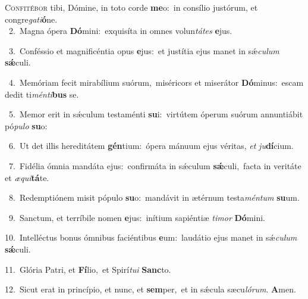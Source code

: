 \lettrine{\initial\textcolor{\initialcolor}{C}}{onfitébor} tibi, Dómine, in toto corde \textbf{me}\-o:~\star in consílio justórum, et congre\-\textit{ga}\-\textit{ti}\textbf{ó}ne.\\
{\numbfont\textcolor{\numbcolor}{~2.}}~Magna ópera \textbf{Dó}\-mini:~\star exquisíta in omnes volun\-\textit{tá}\-\textit{tes} \textbf{e}\-jus.\par
{\numbfont\textcolor{\numbcolor}{~3.}}~Conféssio et magnificéntia opus \textbf{e}\-jus:~\star et justítia ejus manet in sǽ\-\textit{cu}\-\textit{lum} \textbf{sǽ}\-culi.\par
{\numbfont\textcolor{\numbcolor}{~4.}}~Memóriam fecit mirabílium suórum,~\dagger miséricors et miserátor \textbf{Dó}\-minus:~\star escam dedit ti\-\textit{mén}\-\textit{ti}\textbf{bus} se.\par
{\numbfont\textcolor{\numbcolor}{~5.}}~Memor erit in sǽculum testaménti \textbf{su}\-i:~\star virtútem óperum suórum annuntiábit pó\-\textit{pu}\-\textit{lo} \textbf{su}\-o:\par
{\numbfont\textcolor{\numbcolor}{~6.}}~Ut det illis hereditátem \textbf{gén}\-tium:~\star ópera mánuum ejus véritas, \textit{et} \textit{ju}\-\textbf{dí}cium.\par
{\numbfont\textcolor{\numbcolor}{~7.}}~Fidélia ómnia mandáta ejus:~\dagger confirmáta in sǽculum \textbf{sǽ}\-culi,~\star facta in veritáte et \textit{æ}\-\textit{qui}\textbf{tá}te.\par
{\numbfont\textcolor{\numbcolor}{~8.}}~Redemptiónem misit pópulo \textbf{su}\-o:~\star mandávit in ætérnum testa\-\textit{mén}\-\textit{tum} \textbf{su}\-um.\par
{\numbfont\textcolor{\numbcolor}{~9.}}~Sanctum, et terríbile nomen \textbf{e}\-jus:~\star inítium sapiéntiæ \textit{ti}\-\textit{mor} \textbf{Dó}\-mini.\par
{\numbfont\textcolor{\numbcolor}{10.}}~Intelléctus bonus ómnibus faciéntibus \textbf{e}\-um:~\star laudátio ejus manet in sǽ\-\textit{cu}\-\textit{lum} \textbf{sǽ}\-culi.\par
{\numbfont\textcolor{\numbcolor}{11.}}~Glória Patri, et \textbf{Fí}\-lio,~\star et Spirí\-\textit{tu}\-\textit{i} \textbf{Sanc}\-to.\par
{\numbfont\textcolor{\numbcolor}{12.}}~Sicut erat in princípio, et nunc, et \textbf{sem}\-per,~\star et in sǽcula sæcu\-\textit{ló}\-\textit{rum}. \textbf{A}\-men.\par
